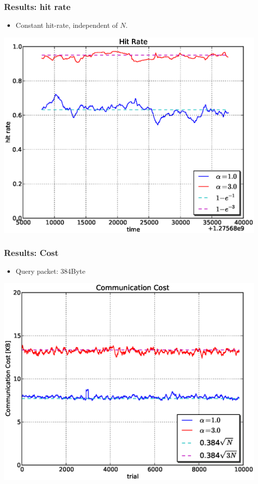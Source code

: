 \documentclass[red]{beamer}
\begin{document}
\begin{frame}
\frametitle{Results: hit rate}
\begin{itemize}
\item Constant hit-rate, independent of $N$.
\end{itemize}
\begin{center}
\includegraphics[scale=0.4]{figs/plab_hit.eps}
\end{center}
\end{frame}

\begin{frame}
\frametitle{Results: Cost}
\begin{itemize}
\item Query packet: 384Byte
\end{itemize}
\begin{center}
\includegraphics[scale=0.4]{figs/plab_cost_kb.eps}
\end{center}
\end{frame}
\end{document}
